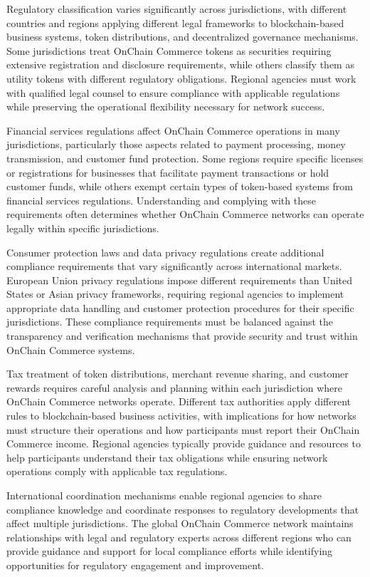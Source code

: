 \documentclass[
  Letterpaper,
]{scrbook}
\begin{document}
Regulatory classification varies significantly across jurisdictions,
with different countries and regions applying different legal frameworks
to blockchain-based business systems, token distributions, and
decentralized governance mechanisms. Some jurisdictions treat OnChain
Commerce tokens as securities requiring extensive registration and
disclosure requirements, while others classify them as utility tokens
with different regulatory obligations. Regional agencies must work with
qualified legal counsel to ensure compliance with applicable regulations
while preserving the operational flexibility necessary for network
success.

Financial services regulations affect OnChain Commerce operations in
many jurisdictions, particularly those aspects related to payment
processing, money transmission, and customer fund protection. Some
regions require specific licenses or registrations for businesses that
facilitate payment transactions or hold customer funds, while others
exempt certain types of token-based systems from financial services
regulations. Understanding and complying with these requirements often
determines whether OnChain Commerce networks can operate legally within
specific jurisdictions.

Consumer protection laws and data privacy regulations create additional
compliance requirements that vary significantly across international
markets. European Union privacy regulations impose different
requirements than United States or Asian privacy frameworks, requiring
regional agencies to implement appropriate data handling and customer
protection procedures for their specific jurisdictions. These compliance
requirements must be balanced against the transparency and verification
mechanisms that provide security and trust within OnChain Commerce
systems.

Tax treatment of token distributions, merchant revenue sharing, and
customer rewards requires careful analysis and planning within each
jurisdiction where OnChain Commerce networks operate. Different tax
authorities apply different rules to blockchain-based business
activities, with implications for how networks must structure their
operations and how participants must report their OnChain Commerce
income. Regional agencies typically provide guidance and resources to
help participants understand their tax obligations while ensuring
network operations comply with applicable tax regulations.

International coordination mechanisms enable regional agencies to share
compliance knowledge and coordinate responses to regulatory developments
that affect multiple jurisdictions. The global OnChain Commerce network
maintains relationships with legal and regulatory experts across
different regions who can provide guidance and support for local
compliance efforts while identifying opportunities for regulatory
engagement and improvement.
\end{document}
